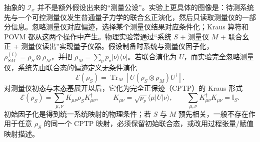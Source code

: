 

抽象的 $\mathcal I_x$ 并不是额外假设出来的“测量公设”。实验上更具体的图像是：待测系统先与一个可控测量仪发生普通量子力学的联合幺正演化，然后只读取测量仪的一部分信息。忽略测量仪对应偏迹，选择某个测量仪结果对应条件化；Kraus 算符和 POVM 都从这两个操作中产生。物理实验常通过“系统 $S$ + 测量仪 $M$ + 联合幺正 + 测量仪读出”实现量子仪器。假设制备时系统与测量仪因子化，$\rho_{SM}^{(i)}=\rho_S\otimes\rho_M$，并把
$\rho_M=\sum_\nu p_\nu|\nu\rangle\langle\nu|$。若联合演化为 $U$，而实验完全忽略测量仪，系统先由联合态的偏迹定义无条件演化
\begin{equation}
\boxed{
\mathscr E(\rho_S)=\operatorname{Tr}_M\!\left[U(\rho_S\otimes\rho_M)U^\dagger\right].}
\label{eq:unitary_dilation_partial_trace_definition}
\end{equation}
对测量仪初态与末态基展开以后，它化为完全正保迹（CPTP）的 Kraus 形式
\begin{equation}
\boxed{
\mathscr E(\rho_S)
=\sum_{\mu,\nu}K_{\mu\nu}\rho_SK_{\mu\nu}^\dagger,
\qquad
K_{\mu\nu}=\sqrt{p_\nu}\langle\mu|U|\nu\rangle,
\qquad
\sum_{\mu,\nu}K_{\mu\nu}^\dagger K_{\mu\nu}=\mathbb I_S.}
\label{eq:general_unitary_dilation_kraus_operator}
\end{equation}
初始因子化是得到统一系统映射的物理条件；若 $S$ 与 $M$ 预先相关，一般不存在作用于任意 $\rho_S$ 的同一个 CPTP 映射，必须保留初始联合态，或改用过程张量/赋值映射描述。

